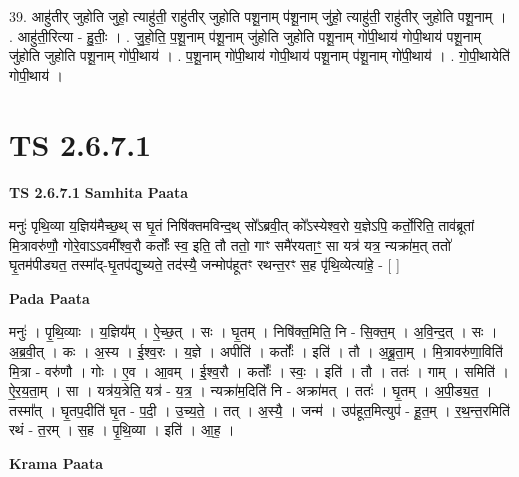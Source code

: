 \documentclass[17pt]{extarticle}
\begin{document}
39. आहु॑तीर् जुहोति जुहो॒ त्याहु॑ती॒ राहु॑तीर् जुहोति पशू॒नाम् प॑शू॒नाम् जु॑हो॒ त्याहु॑ती॒ राहु॑तीर् जुहोति पशू॒नाम् । . आहु॑ती॒रित्या - हु॒तीः॒ । . जु॒हो॒ति॒ प॒शू॒नाम् प॑शू॒नाम् जु॑होति जुहोति पशू॒नाम् गो॑पी॒थाय॑ गोपी॒थाय॑ पशू॒नाम् जु॑होति जुहोति पशू॒नाम् गो॑पी॒थाय॑ । . प॒शू॒नाम् गो॑पी॒थाय॑ गोपी॒थाय॑ पशू॒नाम् प॑शू॒नाम् गो॑पी॒थाय॑ । . गो॒पी॒थायेति॑ गोपी॒थाय॑ । \newline
\pagebreak
{}
\section*{ TS 2.6.7.1 }

\textbf{TS 2.6.7.1 } \newline
\textbf{Samhita Paata} \newline

मनुः॑ पृथि॒व्या य॒ज्ञिय॑मैच्छ॒थ् स घृ॒तं निषि॑क्तमविन्द॒थ् सो᳚ऽब्रवी॒त् को᳚ऽस्येश्व॒रो य॒ज्ञेऽपि॒ कर्तो॒रिति॒ ताव॑ब्रूतां मि॒त्रावरु॑णौ॒ गोरे॒वाऽऽवमी᳚श्व॒रौ कर्तोः᳚ स्व॒ इति॒ तौ ततो॒ गाꣳ समै॑रयताꣳ॒॒ सा यत्र॑ यत्र॒ न्यक्रा॑म॒त् ततो॑ घृ॒तम॑पीड्यत॒ तस्मा᳚द्-घृ॒तप॑द्युच्यते॒ तद॑स्यै॒ जन्मोप॑हूतꣳ रथन्त॒रꣳ स॒ह पृ॑थि॒व्येत्या॑हे॒ - [  ] \newline

\textbf{Pada Paata} \newline

मनुः॑ । पृ॒थि॒व्याः । य॒ज्ञिय᳚म् । ऐ॒च्छ॒त् । सः । घृ॒तम् । निषि॑क्त॒मिति॒ नि - सि॒क्त॒म् । अ॒वि॒न्द॒त् । सः । अ॒ब्र॒वी॒त् । कः । अ॒स्य । ई॒श्व॒रः । य॒ज्ञे । अपीति॑ । कर्तोः᳚ । इति॑ । तौ । अ॒ब्रू॒ता॒म् । मि॒त्रावरु॑णा॒विति॑ मि॒त्रा - वरु॑णौ । गोः । ए॒व । आ॒वम् । ई॒श्व॒रौ । कर्तोः᳚ । स्वः॒ । इति॑ । तौ । ततः॑ । गाम् । समिति॑ । ऐ॒र॒य॒ता॒म् । सा । यत्र॑य॒त्रेति॒ यत्र॑ - य॒त्र॒ । न्यक्रा॑म॒दिति॑ नि - अक्रा॑मत् । ततः॑ । घृ॒तम् । अ॒पी॒ड्य॒त॒ । तस्मा᳚त् । घृ॒तप॒दीति॑ घृ॒त - प॒दी॒ । उ॒च्य॒ते॒ । तत् । अ॒स्यै॒ । जन्म॑ । उप॑हूत॒मित्युप॑ - हू॒त॒म् । र॒थ॒न्त॒रमिति॑ रथं - त॒रम् । स॒ह । पृ॒थि॒व्या । इति॑ । आ॒ह॒ ।  \newline


\textbf{Krama Paata} \newline
\end{document}
